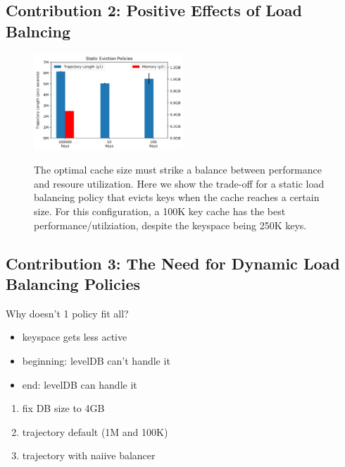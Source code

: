 \subsection{Contribution 2: Positive Effects of Load Balncing}
  \begin{figure}[tbh]
  \noindent\includegraphics[width=0.5\textwidth]{figures/methodology-tradeoff.png}\\
  \caption{The optimal cache size must strike a balance between performance and
  resoure utilization. Here we show the trade-off for a static load balancing
  policy that evicts keys when the cache reaches a certain size. For this
  configuration, a 100K key cache has the best performance/utilziation, despite
  the keyspace being 250K keys. \label{fig:methodology-tradeoff}}
\end{figure}

\subsection{Contribution 3: The Need for Dynamic Load Balancing Policies}
Why doesn't 1 policy fit all?
\begin{itemize}
  \item keyspace gets less active
  \item beginning: levelDB can't handle it
  \item end: levelDB can handle it
\end{itemize}


\begin{enumerate}
  \item fix DB size to 4GB
  \item trajectory default (1M  and 100K)
  \item trajectory with naiive balancer
\end{enumerate}


